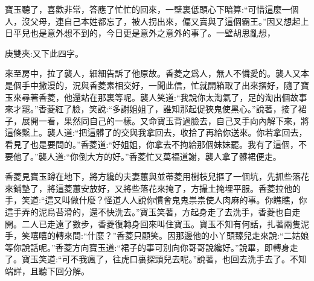 \begin{parag}
    寶玉聽了，喜歡非常，答應了忙忙的回來，一壁裏低頭心下暗算:“可惜這麼一個人，沒父母，連自己本姓都忘了，被人拐出來，偏又賣與了這個霸王。”因又想起上日平兒也是意外想不到的，今日更是意外之意外的事了。一壁胡思亂想，\begin{note}庚雙夾:又下此四字。\end{note}來至房中，拉了襲人，細細告訴了他原故。香菱之爲人，無人不憐愛的。襲人又本是個手中撒漫的，況與香菱素相交好，一聞此信，忙就開箱取了出來摺好，隨了寶玉來尋著香菱，他還站在那裏等呢。襲人笑道:“我說你太淘氣了，足的淘出個故事來才罷。”香菱紅了臉，笑說:“多謝姐姐了，誰知那起促狹鬼使黑心。”說著，接了裙子，展開一看，果然同自己的一樣。又命寶玉背過臉去，自己叉手向內解下來，將這條繫上。襲人道:“把這髒了的交與我拿回去，收拾了再給你送來。你若拿回去，看見了也是要問的。”香菱道:“好姐姐，你拿去不拘給那個妹妹罷。我有了這個，不要他了。”襲人道:“你倒大方的好。”香菱忙又萬福道謝，襲人拿了髒裙便走。
\end{parag}


\begin{parag}
    香菱見寶玉蹲在地下，將方纔的夫妻蕙與並蒂菱用樹枝兒摳了一個坑，先抓些落花來鋪墊了，將這菱蕙安放好，又將些落花來掩了，方撮土掩埋平服。香菱拉他的手，笑道:“這又叫做什麼？怪道人人說你慣會鬼鬼祟祟使人肉麻的事。你瞧瞧，你這手弄的泥烏苔滑的，還不快洗去。”寶玉笑著，方起身走了去洗手，香菱也自走開。二人已走遠了數步，香菱復轉身回來叫住寶玉。寶玉不知有何話，扎著兩隻泥手，笑嘻嘻的轉來問:“什麼？”香菱只顧笑。因那邊他的小丫頭臻兒走來說:“二姑娘等你說話呢。”香菱方向寶玉道:“裙子的事可別向你哥哥說纔好。”說畢，即轉身走了。寶玉笑道:“可不我瘋了，往虎口裏探頭兒去呢。”說著，也回去洗手去了。不知端詳，且聽下回分解。
\end{parag}